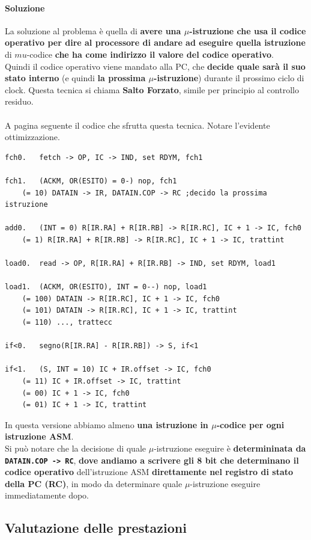 \documentclass[10pt]{report}
\begin{document}
\paragraph{Soluzione} La soluzione al problema è quella di \textbf{avere una $\mu$-istruzione che usa il codice operativo per dire al processore di andare ad eseguire quella istruzione} di $mu$-codice \textbf{che ha come indirizzo il valore del codice operativo}.\\
Quindi il codice operativo viene mandato alla PC, che \textbf{decide quale sarà il suo stato interno} (e quindi \textbf{la prossima $\mu$-istruzione}) durante il prossimo ciclo di clock. Questa tecnica si chiama \textbf{Salto Forzato}, simile per principio al controllo residuo.\\\\
A pagina seguente il codice che sfrutta questa tecnica. Notare l'evidente ottimizzazione.
\pagebreak
\begin{lstlisting}
fch0.	fetch -> OP, IC -> IND, set RDYM, fch1

fch1.	(ACKM, OR(ESITO) = 0-) nop, fch1
	(= 10) DATAIN -> IR, DATAIN.COP -> RC ;decido la prossima istruzione
	
add0.	(INT = 0) R[IR.RA] + R[IR.RB] -> R[IR.RC], IC + 1 -> IC, fch0
	(= 1) R[IR.RA] + R[IR.RB] -> R[IR.RC], IC + 1 -> IC, trattint

load0.	read -> OP, R[IR.RA] + R[IR.RB] -> IND, set RDYM, load1

load1.	(ACKM, OR(ESITO), INT = 0--) nop, load1
	(= 100) DATAIN -> R[IR.RC], IC + 1 -> IC, fch0
	(= 101) DATAIN -> R[IR.RC], IC + 1 -> IC, trattint
	(= 110) ..., trattecc
	
if<0.	segno(R[IR.RA] - R[IR.RB]) -> S, if<1

if<1.	(S, INT = 10) IC + IR.offset -> IC, fch0
	(= 11) IC + IR.offset -> IC, trattint
	(= 00) IC + 1 -> IC, fch0
	(= 01) IC + 1 -> IC, trattint
\end{lstlisting}
In questa versione abbiamo almeno \textbf{una istruzione in $\mu$-codice per ogni istruzione ASM}.\\
Si può notare che la decisione di quale $\mu$-istruzione eseguire è \textbf{determininata da \texttt{DATAIN.COP -> RC}}, \textbf{dove andiamo a scrivere gli 8 bit che determinano il codice operativo} dell'istruzione ASM \textbf{direttamente nel registro di stato della PC (RC)}, in modo da determinare quale $\mu$-istruzione eseguire immediatamente dopo.
\subsection{Valutazione delle prestazioni}
\end{document}

